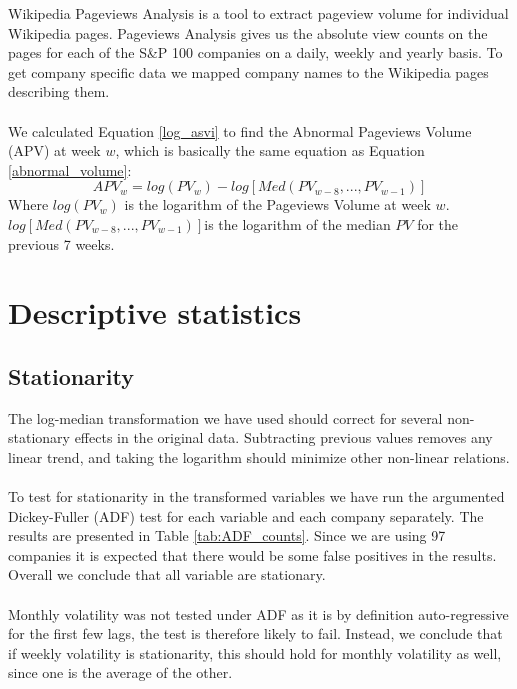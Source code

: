 Wikipedia Pageviews Analysis is a tool to extract pageview volume for individual Wikipedia pages. Pageviews Analysis gives us the absolute view counts on the pages for each of the S\&P 100 companies on a daily, weekly and yearly basis. To get company specific data we mapped company names to the Wikipedia pages describing them.
\\\\
We calculated Equation \eqref{log_asvi} to find the Abnormal Pageviews Volume (APV) at week $w$, which is basically the same equation as Equation \eqref{abnormal_volume}:
\begin{equation}
   \label{abnormal_pageviews_volume} 
   APV_{w} = log(PV_{w}) - log[Med(PV_{w-8},...,PV_{w-1})] 
\end{equation}
   Where $log(PV_{w})$ is the logarithm of the Pageviews Volume at week $w$. $log[Med(PV_{w-8},...,PV_{w-1})]$is the logarithm of the median $PV$ for the previous 7 weeks.


\section{Descriptive statistics}

\subsection{Stationarity}
The log-median transformation we have used should correct for several non-stationary effects in the original data. 
Subtracting previous values removes any linear trend, and taking the logarithm should minimize other non-linear relations. 
\\\\
To test for stationarity in the transformed variables we have run the argumented Dickey-Fuller (ADF) test for each variable and each company separately. The results are presented in Table \ref{tab:ADF_counts}. Since we are using 97 companies it is expected that there would be some false positives in the results. Overall we conclude that all variable are stationary. 
\\\\
Monthly volatility was not tested under ADF as it is by definition auto-regressive for the first few lags, the test is therefore likely to fail. Instead, we conclude that if weekly volatility is stationarity, this should hold for monthly volatility as well, since one is the average of the other.

